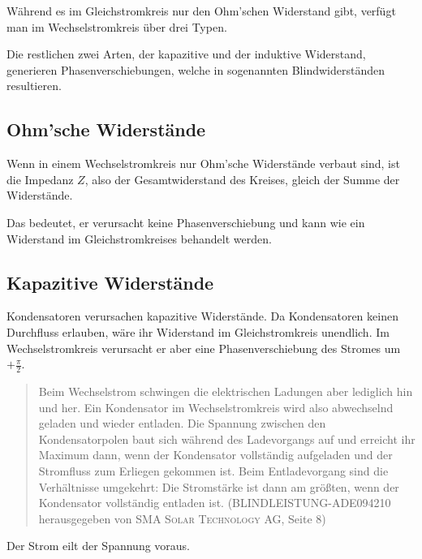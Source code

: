 Während es im Gleichstromkreis nur den Ohm'schen Widerstand gibt, verfügt man im Wechselstromkreis über drei Typen.

Die restlichen zwei Arten, der kapazitive und der induktive Widerstand, generieren Phasenverschiebungen, welche in sogenannten Blindwiderständen resultieren.


\subsection{Ohm'sche Widerstände}		\label{subsec:OhmscherWiderstand}

Wenn in einem Wechselstromkreis nur Ohm'sche Widerstände verbaut sind, ist die Impedanz $Z$, also der Gesamtwiderstand des Kreises, gleich der Summe der Widerstände.

Das bedeutet, er verursacht keine Phasenverschiebung und kann wie ein Widerstand im Gleichstromkreises behandelt werden.


\subsection{Kapazitive Widerstände}		\label{subsec:KapazitiverWiderstand}

Kondensatoren verursachen kapazitive Widerstände. Da Kondensatoren keinen Durchfluss erlauben, wäre ihr Widerstand im Gleichstromkreis unendlich. Im Wechselstromkreis verursacht er aber eine Phasenverschiebung des Stromes um $+\frac{\pi}{2}$.

\begin{quote}
Beim Wechselstrom schwingen die elektrischen Ladungen aber lediglich hin und her. Ein Kondensator im Wechselstromkreis wird also abwechselnd geladen und wieder entladen. Die Spannung zwischen den Kondensatorpolen baut sich während des Ladevorgangs auf und erreicht ihr Maximum dann, wenn der Kondensator vollständig aufgeladen und der Stromfluss zum Erliegen gekommen ist. Beim Entladevorgang sind die Verhältnisse umgekehrt: Die Stromstärke ist dann am größten, wenn der Kondensator vollständig entladen ist. (\glqq BLINDLEISTUNG-ADE094210\grqq{} herausgegeben von \textsc{SMA Solar Technology AG}, Seite 8)
\end{quote}

\noindent \glqq Der Strom eilt der Spannung voraus.\grqq

\vspace{11pt}

